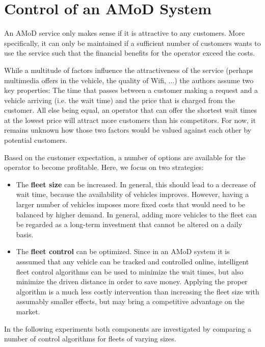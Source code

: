 \section{Control of an AMoD System}
\label{sec:background}

An AMoD service only makes sense if it is attractive to any customers. More
specifically, it can only be maintained if a sufficient number of customers
wants to use the service such that the financial benefits for the operator
exceed the costs.

While a multitude of factors influence the attractiveness of the service (perhaps
multimedia offers in the vehicle, the quality of Wifi, ...) the authors assume
two key properties: The time that passes between a customer making a request
and a vehicle arriving (i.e. the wait time) and the price that is charged from
the customer. All else being equal, an operator that can offer the shortest wait
times at the lowest price will attract more customers than his competitors. For
now, it remains unknown how those two factors would be valued against each other
by potential customers.

Based on the customer expectation, a number of options are available for the
operator to become profitable. Here, we focus on two strategies:

\begin{itemize}
\item The \textbf{fleet size} can be increased. In general, this should lead to
a decrease of wait time, because the availability of vehicles improves. However,
having a larger number of vehicles imposes more fixed costs that would need to be
balanced by higher demand. In general, adding more vehicles to the fleet can be
regarded as a long-term investment that cannot be altered on a daily basis.
\item The \textbf{fleet control} can be optimized. Since in an AMoD system it is
asssumed that any vehicle can be tracked and controlled online, intelligent fleet
control algorithms can be used to minimize the wait times, but also minimize the
driven distance in order to save money. Applying the proper algorithm is a much
less costly intervention than increasing the fleet size with assumably smaller
effects, but may bring a competitive advantage on the market.
\end{itemize}

In the following experiments both components are investigated by comparing a number
of control algorithms for fleets of varying sizes.

